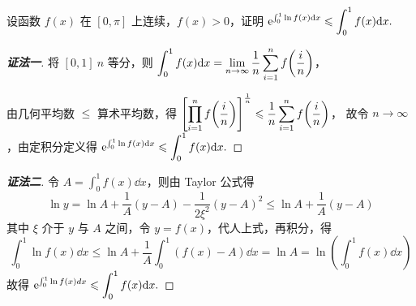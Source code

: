 \begin{example}
    设函数 $f(x)$ 在 $[0,\pi]$ 上连续，$f(x)>0$，证明 $\displaystyle \mathrm{e} ^{\int_{0}^{1}\ln f(x)\dd x}\leqslant \int_{0}^{1}f(x)\dd x.$
\end{example}
\begin{proof}[{\songti \textbf{证法一}}]
    将 $[0,1]~n$ 等分，则 $\displaystyle\int_{0}^{1}f(x)\dd x=\lim_{n\to\infty}\dfrac{1}{n}\sum_{i=1}^{n}f\qty(\dfrac{i}{n})$，
    由几何平均数 $\leqslant $ 算术平均数，得 $\displaystyle \qty[\prod_{i=1}^{n}f\qty(\dfrac{i}{n})]^{\frac{1}{n}}\leqslant \dfrac{1}{n}\sum_{i=1}^{n}f\qty(\frac{i}{n})$，
    故令 $n\to\infty$，由定积分定义得 $\displaystyle \mathrm{e} ^{\int_{0}^{1}\ln f(x)\dd x}\leqslant \int_{0}^{1}f(x)\dd x.$
\end{proof}
\begin{proof}[{\songti \textbf{证法二}}]
    令 $ \displaystyle A=\int_{0}^{1} f(x) \dd  x $，则由 Taylor 公式得
    $$\ln y=\ln A+\frac{1}{A}(y-A)-\frac{1}{2 \xi^{2}}(y-A)^{2} \leqslant \ln A+\frac{1}{A}(y-A)$$
    其中 $ \xi $ 介于 $ y $ 与 $ A $ 之间，令 $ y=f(x)$，代人上式，再积分，得
    $$\int_{0}^{1} \ln f(x) \dd  x \leqslant \ln A+\frac{1}{A} \int_{0}^{1}(f(x)-A) \dd  x=\ln A=\ln \left(\int_{0}^{1} f(x) \dd  x\right)$$
    故得 $ \displaystyle \mathrm{e} ^{\int_{0}^{1} \ln f(x) d x} \leqslant \int_{0}^{1} f(x) \dd  x .$
\end{proof}

